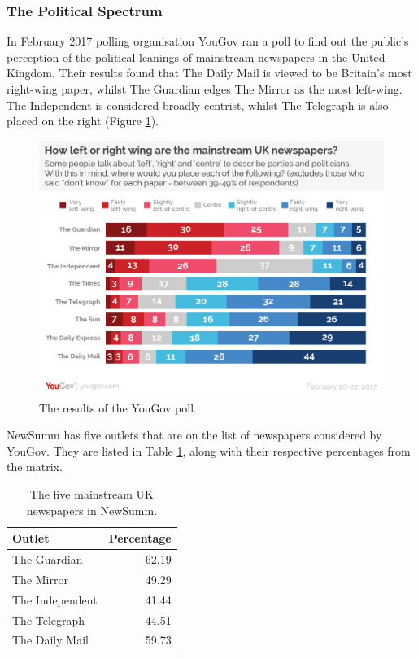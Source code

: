 \documentclass[12pt]{article}
\begin{document}
\subsubsection{The Political Spectrum}

In February 2017 polling organisation YouGov ran a poll to find out the public's perception of the political leanings of mainstream newspapers in the United Kingdom. Their results found that The Daily Mail is viewed to be Britain's most right-wing paper, whilst The Guardian edges The Mirror as the most left-wing. The Independent is considered broadly centrist, whilst The Telegraph is also placed on the right (Figure \ref{yougov}). 

\begin{figure}[ht!]
  \centering
    \includegraphics[scale=0.3]{yougovpoll.png}
   \caption[A graph depicting responses to the User Interface Survey]{The results of the YouGov poll.}
   \label{yougov}
\end{figure}

NewSumm has five outlets that are on the list of newspapers considered by YouGov. They are listed in Table \ref{mediaorganisations}, along with their respective percentages from the matrix.

\begin{table}[H]
	\centering
	\begin{tabular}{l|r}
		\textbf{Outlet} & \textbf{Percentage} \\ \hline
		The Guardian & 62.19 \\ \hline
		The Mirror & 49.29 \\ \hline
		The Independent & 41.44 \\ \hline
		The Telegraph & 44.51 \\ \hline
		The Daily Mail & 59.73 \\ \hline
	\end{tabular}
	\caption[Parameters for estimating topic models]{The five mainstream UK newspapers in NewSumm.}
	\label{mediaorganisations}
\end{table}
\end{document}
